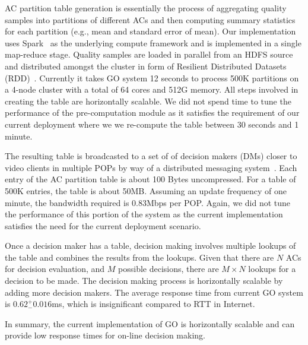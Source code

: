 AC partition table generation is essentially the process of aggregating quality samples into partitions of different ACs and then computing summary statistics for each partition (e.g., mean and standard error of mean).
Our implementation uses Spark~\cite{spark} as the underlying compute framework and is implemented in a single map-reduce stage. 
Quality samples are loaded in parallel from an HDFS source~\cite{hadoop} and distributed amongst the cluster in form of Resilient Distributed Datasets (RDD)~\cite{zaharia2012resilient}. 
Currently it takes GO system 12 seconds to process 500K partitions on a 4-node cluster with a total of 64 cores and 512G memory. 
All steps involved in creating the table are horizontally scalable.
We did not spend time to tune the performance of the pre-computation module as it satisfies the requirement of our current deployment where we we re-compute the table between 30 seconds and 1 minute.


The resulting table is broadcasted to a set of of decision makers (DMs) closer to video clients in multiple POPs by way of a distributed messaging system~\cite{kreps2011kafka}. Each entry of the AC partition table is about 100 Bytes uncompressed. For a table of 500K entries, the table is about 50MB.  Assuming an update frequency of one minute, the bandwidth required is 0.83Mbps per POP. Again, we did not tune the performance of this portion of the system as the current implementation satisfies the need for the current deployment scenario. 

Once a decision maker has a table, decision making involves multiple lookups of the table and combines the results from the lookups.  Given that there are $N$ ACs for decision evaluation, and $M$ possible decisions, there are $M \times N$ lookups for a decision to be made. The decision making process is horizontally scalable by adding more decision makers. The average response time from current GO system is $0.62 ^{+}_{-} 0.016$ms, which is insignificant compared to RTT in Internet.

In summary, the current implementation of GO is horizontally scalable and can provide low response times for on-line decision making. 

\label{subsec:eval_setup}


